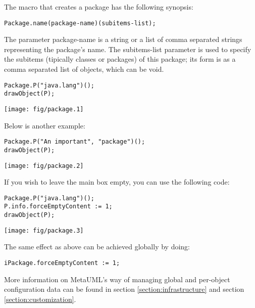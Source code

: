 \documentclass{article}
\newcommand{\code}{\ttfamily}
\begin{document}
The macro that creates a package has the following synopsis:

\begin{verbatim}
Package.name(package-name)(subitems-list);
\end{verbatim}

The parameter {\code package-name} is a string or a list of comma separated strings representing the package's name. The {\code subitems-list} parameter is used to specify the subitems (tipically classes or packages) of this package; its form is as a comma separated list of objects, which can be void.

\begin{multicols}{2}
\begin{verbatim}
Package.P("java.lang")();
drawObject(P);
\end{verbatim}
\columnbreak
\hspace{3cm}\texttt{[image: fig/package.1]}
\end{multicols}

Below is another example:

\begin{multicols}{2}
\begin{verbatim}
Package.P("An important", "package")();
drawObject(P);
\end{verbatim}
\columnbreak
\hspace{3cm}\texttt{[image: fig/package.2]}
\end{multicols}

If you wish to leave the main box empty, you can use the following code:

\begin{multicols}{2}
\begin{verbatim}
Package.P("java.lang")();
P.info.forceEmptyContent := 1;
drawObject(P);
\end{verbatim}
\columnbreak
\hspace{3cm}\texttt{[image: fig/package.3]}
\end{multicols}

The same effect as above can be achieved globally by doing:

\begin{verbatim}
iPackage.forceEmptyContent := 1;
\end{verbatim}

More information on MetaUML's way of managing global and per-object configuration data can be found in section \ref{section:infrastructure} and section \ref{section:customization}.
\end{document}
